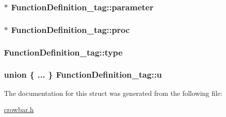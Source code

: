 \subsubsection[{parameter}]{$\ast$ Function\+Definition\+\_\+tag\+::parameter}\label{struct_function_definition__tag_a920e515da65f6d48e75864181108dba4}
\hypertarget{struct_function_definition__tag_a5178ea679186f4c16f227644e060c350}{}
\subsubsection[{proc}]{$\ast$ Function\+Definition\+\_\+tag\+::proc}\label{struct_function_definition__tag_a5178ea679186f4c16f227644e060c350}
\hypertarget{struct_function_definition__tag_a6477190ea35ab3daa69aa8762e302661}{}
\subsubsection[{type}]{ Function\+Definition\+\_\+tag\+::type}\label{struct_function_definition__tag_a6477190ea35ab3daa69aa8762e302661}
\hypertarget{struct_function_definition__tag_a82459859fdf1587b0bf434c5e9c61192}{}
\subsubsection[{u}]{\setlength{\rightskip}{0pt plus 5cm}union \{ ... \}   Function\+Definition\+\_\+tag\+::u}\label{struct_function_definition__tag_a82459859fdf1587b0bf434c5e9c61192}


The documentation for this struct was generated from the following file\+:\begin{DoxyCompactItemize}
\item 
\hyperlink{crowbar_8h}{crowbar.\+h}\end{DoxyCompactItemize}
